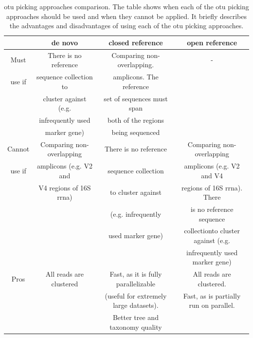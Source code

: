 \begin{table}[htbp]
\tiny
\centering
\caption[\gls{otu} picking approaches comparison. The table shows when each of the \gls{otu} picking approaches should be used and when they cannot be applied. It briefly describes the advantages and disadvantages of using each of the \gls{otu} picking approaches.]{\gls{otu} picking approaches comparison. The table shows when each of the \gls{otu} picking approaches should be used and when they cannot be applied. It briefly describes the advantages and disadvantages of using each of the \gls{otu} picking approaches.}\label{btable3}
\renewcommand{\arraystretch}{0.5}%
\begin{tabular*}{\textwidth}{cccc}
& de novo & closed reference & open reference\\
\toprule
Must   & There is no reference          & Comparing non-overlapping. & -\\
use if & sequence collection to         & amplicons. The reference & \\
       & cluster against (e.g.          & set of sequences must span & \\
       & infrequently used              & both of the regions & \\
       & marker gene)                   & being sequenced & \\
\midrule
Cannot & Comparing non-overlapping   & There is no reference    & Comparing non-overlapping \\
use if & amplicons (e.g. V2 and      & sequence collection      & amplicons (e.g. V2 and V4\\
       &  V4 regions of 16S \gls{rrna})    & to cluster against & regions of 16S \gls{rrna}). There \\
       &                             & (e.g. infrequently       & is no reference sequence\\
       &                             & used marker gene)        & collectionto cluster against (e.g.\\
       &                             &                          & infrequently used marker gene)\\
\midrule
Pros & All reads are clustered & Fast, as it is fully parallelizable    & All reads are clustered.\\
     &                         & (useful for extremely large datasets). & Fast, as is partially run on parallel.\\
     &                         & Better tree and taxonomy quality & \\

\end{tabular*}
\end{table}

